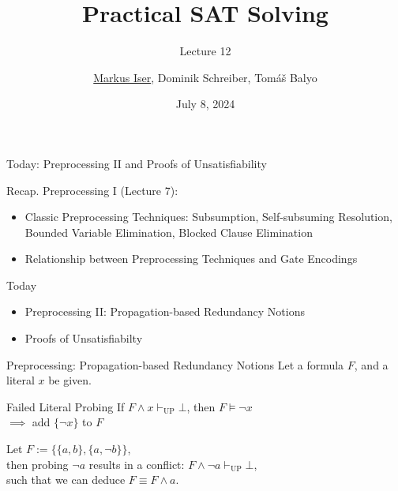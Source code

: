 \documentclass[t]{sdqbeamer}
\title[SAT Solving]{Practical SAT Solving}
\subtitle{Lecture 12}
\author{\underline{Markus Iser}, Dominik Schreiber, Tom\'a\v{s} Balyo}
\date{July 8, 2024}
\begin{document}
\begin{frame}
	\thispagestyle{empty}
	\titlepage
\end{frame}


\begin{frame}{Today: Preprocessing II and Proofs of Unsatisfiability}
    \begin{block}{Recap.}
    Preprocessing I (Lecture 7):
    \begin{itemize}
        \item Classic Preprocessing Techniques: Subsumption, Self-subsuming Resolution, Bounded Variable Elimination, Blocked Clause Elimination
        \item Relationship between Preprocessing Techniques and Gate Encodings
    \end{itemize}
    \end{block}
	\begin{block}{Today}
        \begin{itemize}
            \item Preprocessing II: Propagation-based Redundancy Notions
            \item Proofs of Unsatisfiabilty
        \end{itemize}
	\end{block}
\end{frame}
    

\begin{frame}{Preprocessing: Propagation-based Redundancy Notions}
Let a formula $F$, and a literal $x$ be given.
\begin{block}{Failed Literal Probing}
If $F \land x \vdash_{\mathop{UP}} \bot$, then $F \models \lnot x$\\[1ex]
$\implies$ add $\{ \lnot x \}$ to $F$
\end{block}
\begin{example}
Let $F := \bigl\{ \{a, b\}, \{a, \lnot b\} \bigr\}$,\\[1ex]
then probing $\lnot a$ results in a conflict: $F \land \lnot a \vdash_{\mathop{UP}} \bot$,\\[1ex]
such that we can deduce $F \equiv F \land a$.
\end{example}
\end{frame}
    
\end{document}
